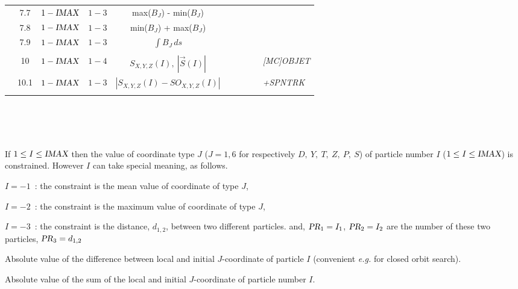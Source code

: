 {\begin{center}
{\begin{tabular}{|>{\bfseries}p{\LL}|c|c|c|c|c|c|c|c|p{\LL}|}
			\multicolumn{1}{|c|}{\footnotesize $B_X$,  $B_Y$,  $B_Z$) }
			    & 7.7 & $1 - \textsl{IMAX}$ & $1 - 3$  & max($B_J$) - min($B_J$) &  & & & &  \\
			\multicolumn{1}{|c|}{\textbf{  }}
			    & 7.8 & $1 - \textsl{IMAX}$ & $1 - 3$  & min($B_J$) + max($B_J$) &  & & & &  \\
			\multicolumn{1}{|c|}{\textbf{  }}
			    & 7.9 & $1 - \textsl{IMAX}$ & $1 - 3$  & $\int B_J \, ds$ & &  & &  \\
                            & & & & & & & & &  \\
%
			\multicolumn{1}{|c|}{\textbf{Spin}}
			    & 10 & $1 - \textsl{IMAX}$ & $1 - 4$  & $  S_{X,Y,Z}(I), ~ |\vec S(I)| $  
         & & & & & \textsl{[MC]OBJET}   \\
			\multicolumn{1}{|c|}{\textbf{  }}
			    & 10.1 & $1 -\textsl{IMAX}$ & $1 -3$  &$|S_{X,Y,Z}(I) -SO_{X,Y,Z}(I)|$
         & & & & & \textsl{+SPNTRK}   \\
                            & & & & & & & & &  \\
			\hline
			\hline
		\end{tabular}  }
~ ~ ~ \\
~ ~ ~ \\
~ ~ ~ 
	\end{center}
} %




\smallskip

 If $1\leq I\leq \textsl{IMAX}$ then the value of coordinate type $J$ ($J=1,6$ for respectively 
 $D,~Y,~T,~Z,~P,~S$) of particle number $I$ ($1\leq I\leq \textsl{IMAX}$) is constrained.  However $I$ can take 
special meaning, as follows. 

$I=-1$~:  the constraint is the mean value of coordinate of type $J$, 

$I=-2$~:  the constraint is the maximum  value of coordinate of type $J$, 

$I=-3$~:  the constraint is the distance, $d_{1,2}$, 
between two different particles.  and,  $\textsl{PR}_1= I_1$, $\textsl{PR}_2=I_2$ are the number  
of these two particles, $\textsl{PR}_3 = d_{1,2}$

\smallskip

 Absolute value of the difference between local and initial $J$-coordinate of particle $I$ (convenient 
\emph{e.g.} for closed orbit search). 

\smallskip

 Absolute value of the sum of the local and initial $J$-coordinate of particle number $I$.

